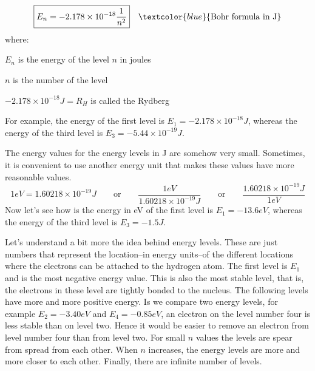 \documentclass[main.tex]{subfiles}
\begin{document}
\begin{description}
\begin{equation*}
\boxed{  E_n=-2.178\times 10^{-18}  \frac{1}{n^2}  } \quad \textcolor{blue}{\text{Bohr formula in J}}
\end{equation*}
where:
\begin{where}
 \item $E_n$   is the energy of the level $n$ in joules
 \item $n$  is the number of the level
  \item $-2.178\times 10^{-18}J=R_H$  is called the Rydberg
\end{where}
For example, the energy of the first level is $E_1=-2.178\times 10^{-18}J$, whereas the energy of the third level is $E_3=-5.44\times 10^{-19}J$.
\item[\docfilehook{Electron-Volt a new unit of energy}{Electron-Volt a new unit of energy}]
The energy values for the energy levels in J are somehow very small. Sometimes, it is convenient to use another energy unit that makes these values have more reasonable values.
\begin{equation*}
\boxed{    1 eV=1.60218\times 10^{-19} J   } \qquad\text{or}\qquad  \boxed{\frac{1 eV}{1.60218\times 10^{-19} J }}\qquad\text{or}\qquad  \boxed{\frac{1.60218\times 10^{-19} J }{1 eV}}
\end{equation*}
Now let's see how is the energy in eV of the first level is $E_1=-13.6eV$, whereas the energy of the third level is $E_3=-1.5J$.

\item[\docfilehook{Energy levels of hydrogen}{Energy levels of hydrogen}]
Let's understand a bit more the idea behind energy levels. These are just numbers that represent the location--in energy units--of the different locations where the electrons can be attached to the hydrogen atom. The first level is $E_1$ and is the most negative energy value. This is also the most stable level, that is, the electrons in these level are tightly bonded to the nucleus. The following levels have more and more positive energy. Is we compare two energy levels, for example $E_2=-3.40eV$ and $E_4=-0.85eV$, an electron on the level number four is less stable than on level two. Hence it would be easier to remove an electron from level number four than from level two. For small $n$ values the levels are spear from spread from each other. When $n$ increases, the energy levels are more and more closer to each other. Finally, there are infinite number of levels.
  \begin{marginfigure}[-4cm]
\end{marginfigure}
\end{description}
\end{document}
